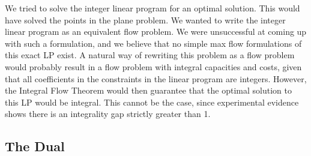 \documentclass[11pt]{article}
\begin{document}
We tried to solve the integer linear program for an optimal solution. This would have solved the points in the plane problem. We wanted to write the integer linear program as an equivalent flow problem. We were unsuccessful at coming up with such a formulation, and we believe that no simple max flow formulations of this exact LP exist. A natural way of rewriting this problem as a flow problem would probably result in a flow problem with integral capacities and costs, given that all coefficients in the constraints in the linear program are integers. However, the Integral Flow Theorem would then guarantee that the optimal solution to this LP would be integral. This cannot be the case, since experimental evidence shows there is an integrality gap strictly greater than 1.

\subsection{The Dual}
\end{document}
